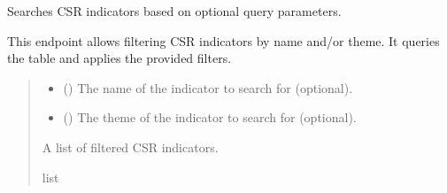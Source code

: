 \documentclass[letterpaper,10pt,english]{sphinxmanual}
\begin{document}
\begin{fulllineitems}
\label{\detokenize{my_fastapi:my_fastapi.main.search_indicators}}
\pysigstartsignatures
\pysiglinewithargsret
{}
{\sphinxparamcomma {}}
{}
\pysigstopsignatures
\sphinxAtStartPar
Searches CSR indicators based on optional query parameters.

\sphinxAtStartPar
This endpoint allows filtering CSR indicators by name and/or theme. It queries the 
table and applies the provided filters.
\begin{quote}\begin{description}
\begin{itemize}
\item {} 
\sphinxAtStartPar
{} (\sphinxstyleliteralemphasis{\sphinxupquote{{[}}}\sphinxstyleliteralemphasis{\sphinxupquote{{]}}}) \textendash{} The name of the indicator to search for (optional).

\item {} 
\sphinxAtStartPar
{} (\sphinxstyleliteralemphasis{\sphinxupquote{{[}}}\sphinxstyleliteralemphasis{\sphinxupquote{{]}}}) \textendash{} The theme of the indicator to search for (optional).

\end{itemize}

\sphinxAtStartPar
A list of filtered CSR indicators.

\sphinxAtStartPar
list

\end{description}\end{quote}

\end{fulllineitems}
\end{document}
